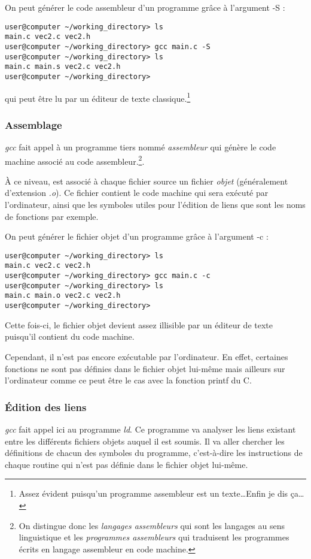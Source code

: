\documentclass[../../../main.tex]{subfiles}
\begin{document}
On peut générer le code assembleur d'un programme grâce à l'argument \textsf{-S} :
\begin{verbatim}
user@computer ~/working_directory> ls
main.c vec2.c vec2.h
user@computer ~/working_directory> gcc main.c -S
user@computer ~/working_directory> ls
main.c main.s vec2.c vec2.h
user@computer ~/working_directory>
\end{verbatim}
qui peut être lu par un éditeur de texte classique.\footnote{Assez évident puisqu'un programme assembleur est un texte\dots Enfin je dis ça\dots}
\subsubsection{Assemblage}
\label{ssub:assemblage}
\textit{gcc} fait appel à un programme tiers nommé \textit{assembleur} qui génère le code machine associé au code assembleur.\footnote{On distingue donc les \textit{langages assembleurs} qui sont les langages au sens linguistique et les \textit{programmes assembleurs} qui traduisent les programmes écrits en langage assembleur en code machine.}.
 
À ce niveau, est associé à chaque fichier source un fichier \textit{objet} (généralement d'extension \textit{.o}). Ce fichier contient le code machine qui sera exécuté par l'ordinateur, ainsi que les symboles utiles pour l'édition de liens que sont les noms de fonctions par exemple.

\begin{minipage}{\textwidth}
	\begin{center}
		
	\end{center}
\end{minipage}
 
On peut générer le fichier objet d'un programme grâce à l'argument \textsf{-c} :
\begin{verbatim}
user@computer ~/working_directory> ls
main.c vec2.c vec2.h
user@computer ~/working_directory> gcc main.c -c
user@computer ~/working_directory> ls
main.c main.o vec2.c vec2.h
user@computer ~/working_directory>
\end{verbatim}
Cette fois-ci, le fichier objet devient assez illisible par un éditeur de texte puisqu'il contient du code machine.

Cependant, il n'est pas encore exécutable par l'ordinateur. En effet, certaines fonctions ne sont pas définies dans le fichier objet lui-même mais ailleurs sur l'ordinateur comme ce peut être le cas avec la fonction \textsf{printf} du C.
\subsubsection{Édition des liens}
\label{ssub:_dition_des_liens}
\textit{gcc} fait appel ici au programme \textit{ld}. Ce programme va analyser les liens existant entre les différents fichiers objets auquel il est soumis. Il va aller chercher les définitions de chacun des symboles du programme, c'est-à-dire les instructions de chaque routine qui n'est pas définie dans le fichier objet lui-même.
\end{document}
